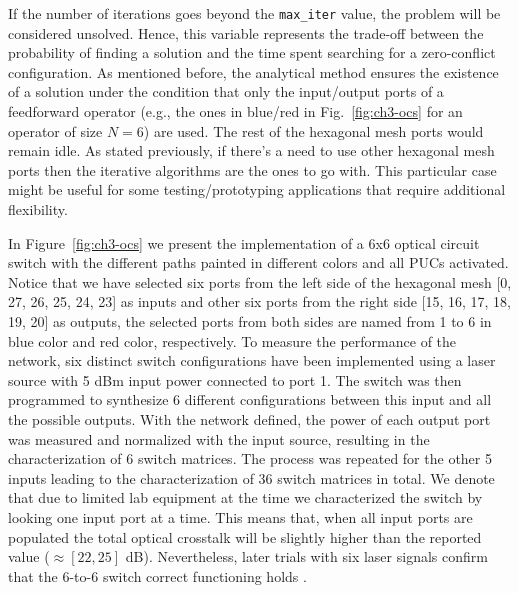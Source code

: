 If the number of iterations goes beyond the \lstinline|max_iter| value, the problem will be considered unsolved.
Hence, this variable represents the trade-off between the probability of finding a solution and the time spent searching for a zero-conflict configuration.
As mentioned before, the analytical method ensures the existence of a solution under the condition that only the input/output ports of a feedforward operator (e.g., the ones in blue/red in Fig.~\ref{fig:ch3-ocs} for an operator of size $N=6$) are used.
The rest of the hexagonal mesh ports would remain idle.
As stated previously, if there's a need to use other hexagonal mesh ports then the iterative algorithms are the ones to go with.
This particular case might be useful for some testing/prototyping applications that require additional flexibility.

In Figure~\ref{fig:ch3-ocs} we present the implementation of a 6x6 optical circuit switch with the different paths painted in different colors and all PUCs activated.
Notice that we have selected six ports from the left side of the hexagonal mesh [0, 27, 26, 25, 24, 23] as inputs and other six ports from the right side [15, 16, 17, 18, 19, 20] as outputs, the selected ports from both sides are named from 1 to 6 in blue color and red color, respectively.
To measure the performance of the network, six distinct switch configurations have been implemented using a laser source with 5 dBm input power connected to port 1.
The switch was then programmed to synthesize 6 different configurations between this input and all the possible outputs.
With the network defined, the power of each output port was measured and normalized with the input source, resulting in the characterization of 6 switch matrices.
The process was repeated for the other 5 inputs leading to the characterization of 36 switch matrices in total.
We denote that due to limited lab equipment at the time we characterized the switch by looking one input port at a time.
This means that, when all input ports are populated the total optical crosstalk will be slightly higher than the reported value (\(\approx [22,25]\) dB).
Nevertheless, later trials with six laser signals confirm that the 6-to-6 switch correct functioning holds \cite{sanchez-jacome_parametric_2024}.

